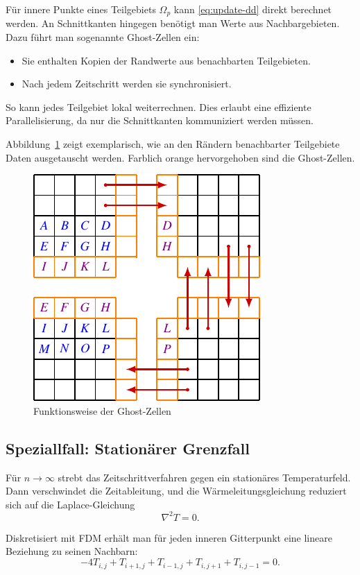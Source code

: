 Für innere Punkte eines Teilgebiets $\Omega_p$ kann \eqref{eq:update-dd} direkt berechnet werden.  
An Schnittkanten hingegen benötigt man Werte aus Nachbargebieten.  
Dazu führt man sogenannte Ghost-Zellen ein:
\begin{itemize}
	\item Sie enthalten Kopien der Randwerte aus benachbarten Teilgebieten.
	\item Nach jedem Zeitschritt werden sie synchronisiert.
\end{itemize}
So kann jedes Teilgebiet lokal weiterrechnen. Dies erlaubt eine effiziente Parallelisierung, da nur die Schnittkanten kommuniziert werden müssen.

Abbildung~\ref{parallelisierung:fig:ghostCells} zeigt exemplarisch, wie an den Rändern benachbarter Teilgebiete Daten ausgetauscht werden. Farblich orange hervorgehoben sind die Ghost-Zellen.

\begin{figure}
	\centering
	\includegraphics{papers/parallelisierung/images/ghostCells.pdf}
	\caption{Funktionsweise der Ghost-Zellen}
	\label{parallelisierung:fig:ghostCells}
\end{figure}



\subsection{Speziallfall: Stationärer Grenzfall}
Für $n \to \infty$ strebt das Zeitschrittverfahren gegen ein stationäres Temperaturfeld. 
Dann verschwindet die Zeitableitung, und die Wärmeleitungsgleichung reduziert sich auf die Laplace-Gleichung
\[
\nabla^2 T = 0.
\]

Diskretisiert mit FDM erhält man für jeden inneren Gitterpunkt eine lineare Beziehung zu seinen Nachbarn:
\[
-4T_{i,j} + T_{i+1,j} + T_{i-1,j} + T_{i,j+1} + T_{i,j-1} = 0.
\]


